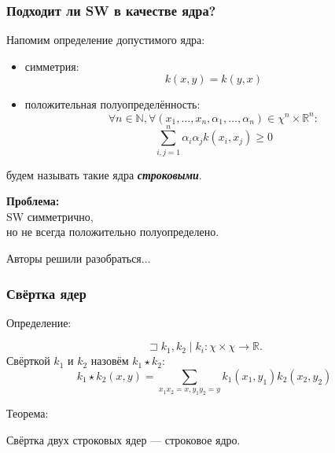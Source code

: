\documentclass{beamer}
\begin{document}
\begin{frame}
\frametitle{Подходит ли SW в качестве ядра?}
Напомим определение допустимого ядра:
\begin{itemize}
    \item симметрия:
    \begin{equation*}
        k(x, y) = k(y, x)
    \end{equation*}

    \item положительная полуопределённость:
    \begin{equation*}
        \forall n \in \mathbb{N},
        \forall (x_1, \dots, x_n, \alpha_1, \dots, \alpha_n)
            \in \chi^n \times \mathbb{R}^n:
    \end{equation*}
    \begin{equation*}
        \sum^n_{i, j = 1} \alpha_i \alpha_j k(x_i, x_j) \geq 0
    \end{equation*}
\end{itemize}
будем называть такие ядра \textit{\textbf{строковыми}}.

\bigskip
\textbf{Проблема:}\\
SW симметрично,\\но не всегда положительно полуопределено.

\bigskip
Авторы решили разобраться...
\end{frame}

\begin{frame}
\frametitle{Свёртка ядер}
Определение:

\begin{equation*}
    \sqsupset k_1, k_2 \mid k_i: \chi \times \chi \to \mathbb{R}.
\end{equation*}
Свёрткой $k_1$ и $k_2$
назовём $k_1 \star k_2$:
\begin{equation*}
    k_1 \star k_2(x, y)
    = \sum_{x_1 x_2 = x, y_1 y_2 = y} k_1(x_1, y_1) k_2(x_2, y_2)
\end{equation*}

\bigskip
Теорема:

Свёртка двух строковых ядер --- строковое ядро.
\end{frame}
\end{document}
